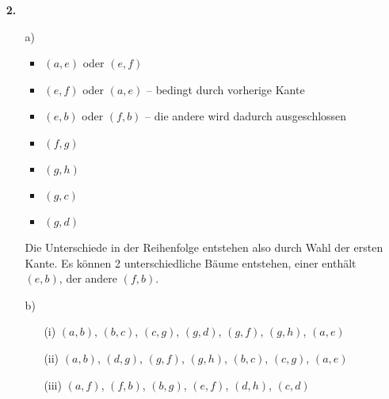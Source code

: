 \documentclass[a4paper,11pt]{article}
\begin{document}
\begin{enumerate}
\begin{enumerate}
        \vspace{5mm}\begin{center}
        \end{center}
    \end{enumerate}

\item[\textbf{2.}]
    \begin{enumerate}
    \item[a)]
        \begin{itemize}
            \item $(a, e)$ oder $(e, f)$
            \item $(e, f)$ oder $(a, e)$ -- bedingt durch vorherige Kante
            \item $(e, b)$ oder $(f, b)$ -- die andere wird dadurch ausgeschlossen
            \item $(f, g)$
            \item $(g, h)$
            \item $(g, c)$
            \item $(g, d)$
        \end{itemize}

        Die Unterschiede in der Reihenfolge entstehen also durch Wahl der ersten
        Kante. Es können 2 unterschiedliche Bäume entstehen, einer enthält
        $(e, b)$, der andere $(f, b)$.

    \item[b)]
        \begin{enumerate}
        \item[(i)]
            $(a, b)$, $(b, c)$, $(c, g)$, $(g, d)$, $(g, f)$, $(g, h)$, $(a, e)$
        \item[(ii)]
            $(a, b)$, $(d, g)$, $(g, f)$, $(g, h)$, $(b, c)$, $(c, g)$, $(a, e)$
        \item[(iii)]
            $(a, f)$, $(f, b)$, $(b, g)$, $(e, f)$, $(d, h)$, $(c, d)$
        \end{enumerate}
    \end{enumerate}
\end{enumerate}
\end{document}
